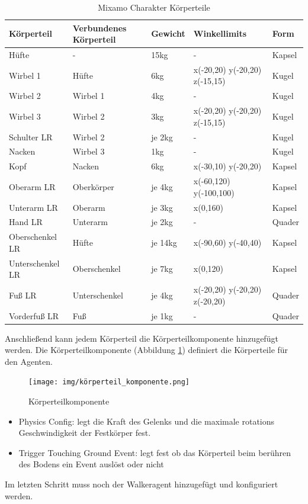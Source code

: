 \begin{table}[H]
  \centering
  {
  \begin{tabular}{ |p{3cm}|p{3cm}|p{2cm}|p{4cm}|p{2cm}| }
  \hline
  \textbf{Körpertei}l& \textbf{Verbundenes Körperteil} & \textbf{Gewicht} & \textbf{Winkellimits} & \textbf{Form} \\
  \hline
  Hüfte & - & 15kg & - & Kapsel \\
  \hline
  Wirbel 1 & Hüfte & 6kg & x(-20,20) y(-20,20) z(-15,15) & Kugel \\
  \hline
  Wirbel 2 & Wirbel 1 & 4kg & - & Kugel \\
  \hline
  Wirbel 3 & Wirbel 2 & 3kg & x(-20,20) y(-20,20) z(-15,15) & Kugel \\
  \hline
  Schulter LR & Wirbel 2 & je 2kg& - & Kugel \\
  \hline
  Nacken & Wirbel 3 & 1kg & - & Kugel \\
  \hline
  Kopf & Nacken & 6kg & x(-30,10) y(-20,20) & Kapsel \\
  \hline
  Oberarm LR & Oberkörper & je 4kg & x(-60,120) y(-100,100) & Kapsel \\
  \hline
  Unterarm LR & Oberarm & je 3kg & x(0,160) & Kapsel \\
  \hline
  Hand LR & Unterarm & je 2kg & - & Quader \\
  \hline
  Oberschenkel LR & Hüfte & je 14kg& x(-90,60) y(-40,40) & Kapsel \\
  \hline
  Unterschenkel LR & Oberschenkel & je 7kg &  x(0,120) & Kapsel \\
  \hline
  Fuß LR & Unterschenkel & je 4kg & x(-20,20) y(-20,20) z(-20,20) & Quader \\
  \hline
  Vorderfuß LR & Fuß & je 1kg & - & Quader \\
  \hline
  \end{tabular}}
  \caption{Mixamo Charakter Körperteile}
  \label{table:mixamo_körperteile}
\end{table}

Anschließend kann jedem Körperteil die Körperteilkomponente hinzugefügt werden. Die Körperteilkomponente (Abbildung \ref{fig:körperteil_komponente}) definiert die Körperteile für den Agenten.
\begin{figure}[H]
  \centering  
  \texttt{[image: img/körperteil\_komponente.png]}
  \caption{Körperteilkomponente}
  \label{fig:körperteil_komponente}
\end{figure}

\begin{itemize}
  \item Physics Config: legt die Kraft des Gelenks und die maximale rotations Geschwindigkeit der Festkörper fest.
  \item Trigger Touching Ground Event: legt fest ob das Körperteil beim berühren des Bodens ein Event auslöst oder nicht
\end{itemize}

Im letzten Schritt muss noch der Walkeragent hinzugefügt und konfiguriert werden.